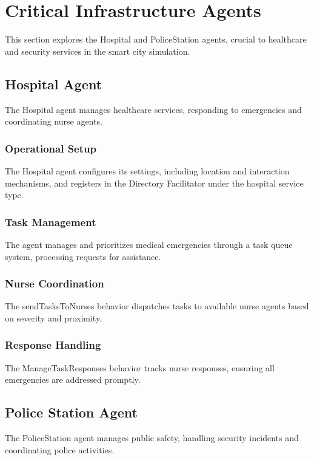 \documentclass[conference]{IEEEtran}
\begin{document}
  
  \section{Critical Infrastructure Agents}
  This section explores the Hospital and PoliceStation agents, crucial to healthcare and security services in the smart city simulation.
  
  \subsection{Hospital Agent}
  The Hospital agent manages healthcare services, responding to emergencies and coordinating nurse agents.
  
  \subsubsection{Operational Setup}
  The Hospital agent configures its settings, including location and interaction mechanisms, and registers in the Directory Facilitator under the hospital service type.
  
  \subsubsection{Task Management}
  The agent manages and prioritizes medical emergencies through a task queue system, processing requests for assistance.
  
  \subsubsection{Nurse Coordination}
  The sendTasksToNurses behavior dispatches tasks to available nurse agents based on severity and proximity.
  
  \subsubsection{Response Handling}
  The ManageTaskResponses behavior tracks nurse responses, ensuring all emergencies are addressed promptly.
  
  \subsection{Police Station Agent}
  The PoliceStation agent manages public safety, handling security incidents and coordinating police activities.
  
\end{document}
